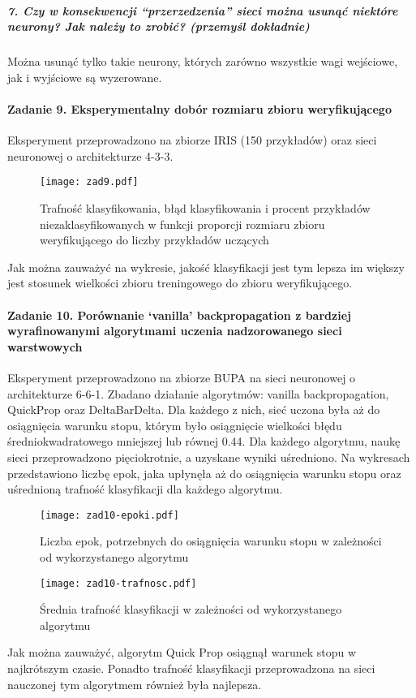 \documentclass{article}
\begin{document}
\subparagraph{7. Czy w konsekwencji “przerzedzenia” sieci można usunąć niektóre neurony? Jak należy to zrobić? (przemyśl dokładnie)}
Można usunąć tylko takie neurony, których zarówno wszystkie wagi wejściowe, jak i wyjściowe są wyzerowane. 

\paragraph{Zadanie 9. Eksperymentalny dobór rozmiaru zbioru weryfikującego}
Eksperyment przeprowadzono na zbiorze IRIS (150 przykładów) oraz sieci neuronowej o architekturze 4-3-3.

\begin{figure}[H]
\begin{center}
\texttt{[image: zad9.pdf]}
\end{center}
\caption{Trafność klasyfikowania, błąd klasyfikowania i procent przykładów niezaklasyfikowanych w funkcji proporcji rozmiaru zbioru weryfikującego do liczby przykładów uczących}
\label{fig-1Tdelta}
\end{figure}

Jak można zauważyć na wykresie, jakość klasyfikacji jest tym lepsza im większy jest stosunek wielkości zbioru treningowego do zbioru weryfikującego. 

\paragraph{Zadanie 10. Porównanie ‘vanilla’ backpropagation z bardziej wyrafinowanymi algorytmami uczenia nadzorowanego sieci warstwowych}

Eksperyment przeprowadzono na zbiorze BUPA na sieci neuronowej o architekturze 6-6-1. Zbadano działanie algorytmów: vanilla backpropagation, QuickProp oraz DeltaBarDelta. Dla każdego z nich, sieć uczona była aż do osiągnięcia warunku stopu, którym było osiągnięcie wielkości błędu średniokwadratowego mniejszej lub równej 0.44. Dla każdego algorytmu, naukę sieci przeprowadzono pięciokrotnie, a uzyskane wyniki uśredniono. 
Na wykresach przedstawiono liczbę epok, jaka upłynęła aż do osiągnięcia warunku stopu oraz uśrednioną trafność klasyfikacji dla każdego algorytmu. 

\begin{figure}[H]
\begin{center}
\texttt{[image: zad10-epoki.pdf]}
\end{center}
\caption{Liczba epok, potrzebnych do osiągnięcia warunku stopu w zależności od wykorzystanego algorytmu}
\label{fig-1Tdelta}
\end{figure}

\begin{figure}[H]
\begin{center}
\texttt{[image: zad10-trafnosc.pdf]}
\end{center}
\caption{Średnia trafność klasyfikacji w zależności od wykorzystanego algorytmu}
\label{fig-1Tdelta}
\end{figure}

Jak można zauważyć, algorytm Quick Prop osiągnął warunek stopu w najkrótszym czasie. Ponadto trafność klasyfikacji przeprowadzona na sieci nauczonej tym algorytmem również była najlepsza. 
\end{document}
